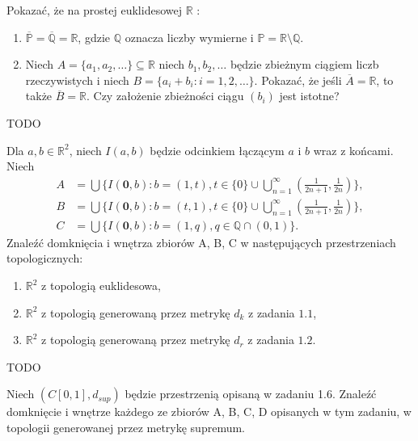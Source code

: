 \begin{problem}[1.15]
	Pokazać, że na prostej euklidesowej $\mathbb{R}$ :
	\begin{enumerate}[label=\alph*)]
		\item $\overline{\mathbb{P} } = \overline{\mathbb{Q}} = \mathbb{R}$, gdzie $\mathbb{Q}$ oznacza liczby wymierne i $\mathbb{P} = \mathbb{R}\setminus \mathbb{Q}.$
		\item Niech $A = \{a_1,a_2,\ldots\} \subseteq \mathbb{R}$ niech $b_1, b_2,\ldots$ będzie zbieżnym ciągiem liczb rzeczywistych i niech $B = \{ a_{i} + b_{i}: i = 1,2,\ldots\} $. Pokazać, że jeśli $\overline{A} = \mathbb{R}$, to także $\overline{B} = \mathbb{R}$. Czy założenie zbieżności ciągu $\left( b_{i} \right) $ jest istotne?
	\end{enumerate}
\end{problem} 
\begin{solution}
	TODO
\end{solution} 
\begin{problem}[1.16]
	Dla $a,b \in \mathbb{R}^2$, niech $I\left( a,b \right) $ będzie odcinkiem łączącym $a$ i $b$ wraz z końcami. Niech 
	\begin{align*}
		A &= \bigcup \{I\left( \mathbf{0},b \right) : b = \left( 1,t \right), t \in \{0\} \cup \bigcup_{n=1}^{\infty}\left( \tfrac{1}{2n+1}, \tfrac{1}{2n} \right)  \},   \\
                B &= \bigcup \{I\left( \mathbf{0},b \right) : b = \left( t,1 \right), t \in \{0\} \cup \bigcup_{n=1}^{\infty}\left( \tfrac{1}{2n+1}, \tfrac{1}{2n} \right)  \},   \\
		C &= \bigcup \{I\left( \mathbf{0},b \right) : b = \left( 1,q \right), q \in \mathbb{Q} \cap \left( 0,1 \right) \}
	.\end{align*}
	Znaleźć domknięcia i wnętrza zbiorów A, B, C w następujących przestrzeniach topologicznych:
	\begin{enumerate}[label=\alph*)]
		\item $\mathbb{R}^2$ z topologią euklidesowa,
		\item $\mathbb{R}^2$ z topologią generowaną przez metrykę $d_{k}$ z zadania $1.1$,
		\item $\mathbb{R}^2$ z topologią generowaną przez metrykę $d_{r}$ z zadania $1.2$.
	\end{enumerate}
\end{problem} 
\begin{solution}
	TODO
\end{solution} 
\begin{problem}[1.18]
	Niech $\left( C[0,1], d_{sup} \right) $ będzie przestrzenią opisaną w zadaniu 1.6. Znaleźć domknięcie i wnętrze każdego ze zbiorów A, B, C, D opisanych w tym zadaniu, w topologii generowanej przez metrykę supremum.
\end{problem} 
